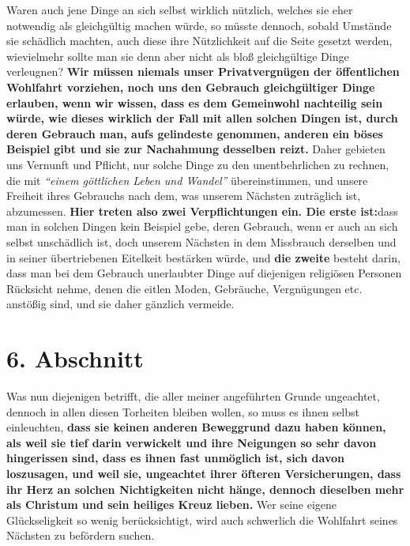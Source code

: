 Waren auch jene Dinge an sich selbst wirklich nützlich, welches sie eher
notwendig als gleichgültig machen würde, so müsste dennoch, sobald Umstände sie
schädlich machten, auch diese ihre Nützlichkeit auf die Seite gesetzt werden,
wievielmehr sollte man sie denn aber nicht als bloß gleichgültige Dinge
verleugnen? \textbf{Wir müssen niemals unser Privatvergnügen der öffentlichen
Wohlfahrt
vorziehen, noch uns den Gebrauch gleichgültiger Dinge erlauben, wenn wir wissen,
dass es dem Gemeinwohl nachteilig sein würde, wie dieses wirklich der Fall mit
allen solchen Dingen ist, durch deren Gebrauch man, aufs gelindeste genommen,
anderen ein böses Beispiel gibt und sie zur Nachahmung desselben reizt.} Daher
gebieten uns Vernunft und Pflicht, nur solche Dinge zu den unentbehrlichen zu
rechnen, die mit
\textit{"`einem göttlichen Leben und Wandel"'}
übereinstimmen, und unsere Freiheit ihres Gebrauchs nach dem, was unserem
Nächsten zuträglich ist, abzumessen. \textbf{Hier treten also zwei
Verpflichtungen ein.
Die erste ist:}dass man in solchen Dingen kein Beispiel gebe, deren Gebrauch,
wenn er auch an sich selbst unschädlich ist, doch unserem Nächsten in dem
Missbrauch derselben und in seiner übertriebenen Eitelkeit bestärken würde, und
\textbf{die zweite} besteht darin, dass man bei dem Gebrauch unerlaubter Dinge
auf
diejenigen religiösen Personen Rücksicht nehme, denen die eitlen Moden,
Gebräuche, Vergnügungen etc. anstößig sind, und sie daher gänzlich
vermeide.

\section{6. Abschnitt} \label{kap18_ab6}

Was nun diejenigen betrifft, die aller meiner angeführten Grunde ungeachtet,
dennoch in allen diesen Torheiten bleiben wollen, so muss es ihnen selbst
einleuchten, \textbf{dass sie keinen anderen Beweggrund dazu haben können, als
weil sie
tief darin verwickelt und ihre Neigungen so sehr davon hingerissen sind, dass es
ihnen fast unmöglich ist, sich davon loszusagen, und weil sie, ungeachtet ihrer
öfteren Versicherungen, dass ihr Herz an solchen Nichtigkeiten nicht hänge,
dennoch dieselben mehr als Christum und sein heiliges Kreuz
lieben.} Wer seine
eigene Glückseligkeit so wenig berücksichtigt, wird auch schwerlich die
Wohlfahrt seines Nächsten zu befördern suchen.

\medskip

